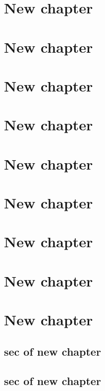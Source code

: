 \documentclass[11pt,table]{book}
\begin{document}
\chapter{New chapter}
\chapter{New chapter}
\chapter{New chapter}
\chapter{New chapter}
\chapter{New chapter}
\chapter{New chapter}
\chapter{New chapter}
\chapter{New chapter}
\chapter{New chapter}
 \section{sec of new chapter}\lipsum[1-5]
 \section{sec of new chapter}
\lipsum[1-5]

\end{document}
